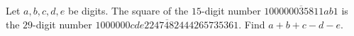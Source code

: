 Let $a,b,c,d,e$ be digits. The square of the $15$-digit number $\overline{100000035811ab1}$ is the $29$-digit number $\overline{1000000cde2247482444265735361}$. Find $a+b+c-d-e$.
